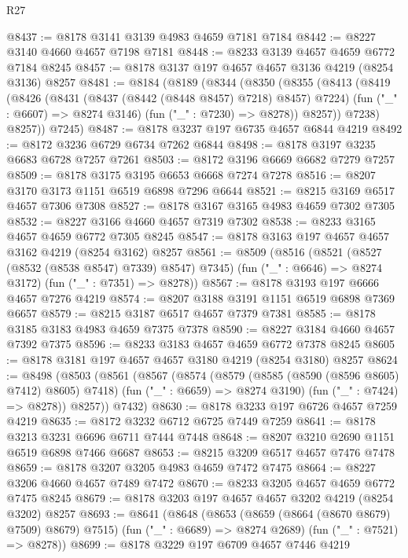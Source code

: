 \begin{lexlean}{R27}
\begin{coremodule}
@8437 := @8178 @3141 @3139 @4983 @4659 @7181 @7184
@8442 := @8227 @3140 @4660 @4657 @7198 @7181
@8448 := @8233 @3139 @4657 @4659 @6772 @7184 @8245
@8457 := @8178 @3137 @197 @4657 @4657 @3136 @4219 (@8254 @3136) @8257
@8481 := @8184
    (@8189
      (@8344
        (@8350
          (@8355
            (@8413
              (@8419
                (@8426
                  (@8431 (@8437 (@8442 (@8448 @8457) @7218) @8457) @7224)
                  (fun ("_" : @6607) => @8274 @3146)
                  (fun ("_" : @7230) => @8278))
                @8257))
            @7238)
          @8257))
      @7245)
@8487 := @8178 @3237 @197 @6735 @4657 @6844 @4219
@8492 := @8172 @3236 @6729 @6734 @7262 @6844
@8498 := @8178 @3197 @3235 @6683 @6728 @7257 @7261
@8503 := @8172 @3196 @6669 @6682 @7279 @7257
@8509 := @8178 @3175 @3195 @6653 @6668 @7274 @7278
@8516 := @8207 @3170 @3173 @1151 @6519 @6898 @7296 @6644
@8521 := @8215 @3169 @6517 @4657 @7306 @7308
@8527 := @8178 @3167 @3165 @4983 @4659 @7302 @7305
@8532 := @8227 @3166 @4660 @4657 @7319 @7302
@8538 := @8233 @3165 @4657 @4659 @6772 @7305 @8245
@8547 := @8178 @3163 @197 @4657 @4657 @3162 @4219 (@8254 @3162) @8257
@8561 := @8509
    (@8516
      (@8521 (@8527 (@8532 (@8538 @8547) @7339) @8547) @7345)
      (fun ("_" : @6646) => @8274 @3172)
      (fun ("_" : @7351) => @8278))
@8567 := @8178 @3193 @197 @6666 @4657 @7276 @4219
@8574 := @8207 @3188 @3191 @1151 @6519 @6898 @7369 @6657
@8579 := @8215 @3187 @6517 @4657 @7379 @7381
@8585 := @8178 @3185 @3183 @4983 @4659 @7375 @7378
@8590 := @8227 @3184 @4660 @4657 @7392 @7375
@8596 := @8233 @3183 @4657 @4659 @6772 @7378 @8245
@8605 := @8178 @3181 @197 @4657 @4657 @3180 @4219 (@8254 @3180) @8257
@8624 := @8498
    (@8503
      (@8561
        (@8567
          (@8574
            (@8579 (@8585 (@8590 (@8596 @8605) @7412) @8605) @7418)
            (fun ("_" : @6659) => @8274 @3190)
            (fun ("_" : @7424) => @8278))
          @8257))
      @7432)
@8630 := @8178 @3233 @197 @6726 @4657 @7259 @4219
@8635 := @8172 @3232 @6712 @6725 @7449 @7259
@8641 := @8178 @3213 @3231 @6696 @6711 @7444 @7448
@8648 := @8207 @3210 @2690 @1151 @6519 @6898 @7466 @6687
@8653 := @8215 @3209 @6517 @4657 @7476 @7478
@8659 := @8178 @3207 @3205 @4983 @4659 @7472 @7475
@8664 := @8227 @3206 @4660 @4657 @7489 @7472
@8670 := @8233 @3205 @4657 @4659 @6772 @7475 @8245
@8679 := @8178 @3203 @197 @4657 @4657 @3202 @4219 (@8254 @3202) @8257
@8693 := @8641
    (@8648
      (@8653 (@8659 (@8664 (@8670 @8679) @7509) @8679) @7515)
      (fun ("_" : @6689) => @8274 @2689)
      (fun ("_" : @7521) => @8278))
@8699 := @8178 @3229 @197 @6709 @4657 @7446 @4219

\end{coremodule}
\end{lexlean}
